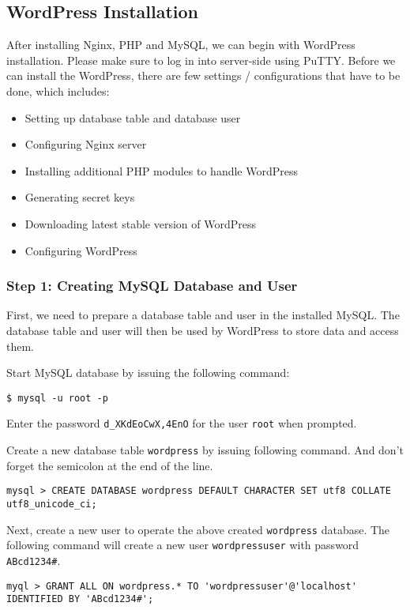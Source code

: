 \subsection{WordPress Installation}
After installing Nginx, PHP and MySQL, we can begin with WordPress installation. Please make sure to log in into server-side using PuTTY. Before we can install the WordPress, there are few settings / configurations that have to be done, which includes:
\begin{itemize}
\item Setting up database table and database user
\item Configuring Nginx server
\item Installing additional PHP modules to handle WordPress
\item Generating secret keys
\item Downloading latest stable version of WordPress
\item Configuring WordPress
\end{itemize}

\subsubsection*{Step 1: Creating MySQL Database and User}

First, we need to prepare a database table and user in the installed MySQL. The database table and user will then be used by WordPress to store data and access them.

Start MySQL database by issuing the following command:

\begin{lstlisting}
$ mysql -u root -p
\end{lstlisting}

Enter the password \texttt{d\_XKdEoCwX,4EnO} for the user \texttt{root} when prompted.

Create a new database table \texttt{wordpress} by issuing following command. And don't forget the semicolon at the end of the line.
\begin{lstlisting}
mysql > CREATE DATABASE wordpress DEFAULT CHARACTER SET utf8 COLLATE utf8_unicode_ci;
\end{lstlisting}

Next, create a new user to operate the above created \texttt{wordpress} database. The following command will create a new user \texttt{wordpressuser} with password \texttt{ABcd1234\#}.

\begin{lstlisting}
myql > GRANT ALL ON wordpress.* TO 'wordpressuser'@'localhost' IDENTIFIED BY 'ABcd1234#';
\end{lstlisting}

